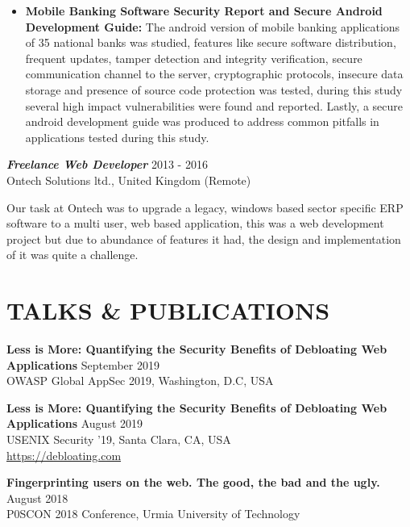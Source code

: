 \documentclass[margin, 10pt]{res} %
\begin{document}
\begin{resume}
\begin{itemize} \itemsep -2pt %
\item \textbf{Mobile Banking Software Security Report and Secure Android Development Guide:} The  android  version  of  mobile  banking  applications  of  35  national  banks  was studied,   features   like   secure   software   distribution,   frequent   updates,   tamper detection  and  integrity  verification,  secure  communication  channel  to  the  server, cryptographic  protocols,  insecure  data  storage  and  presence  of  source code protection  was tested,  during  this  study  several  high  impact  vulnerabilities  were  found  and reported.  Lastly,  a  secure  android  development  guide  was  produced  to  address common pitfalls in applications tested during this study.
\end{itemize}

{\sl \textbf{Freelance Web Developer}} \hfill 2013 - 2016\\
Ontech Solutions ltd., United Kingdom (Remote)


Our  task  at  Ontech  was  to  upgrade  a  legacy,  windows  based sector specific ERP software to a multi user, web based application, this was a web development  project  but  due  to  abundance  of     features  it  had,  the  design  and implementation of it was quite a challenge.




\section{TALKS \& PUBLICATIONS}

\textbf{Less is More: Quantifying the Security Benefits of Debloating Web Applications} \hfill September 2019\\
OWASP Global AppSec 2019, Washington, D.C, USA

\textbf{Less is More: Quantifying the Security Benefits of Debloating Web Applications} \hfill August 2019\\
USENIX Security '19, Santa Clara, CA, USA\\
\url{https://debloating.com}

\textbf{Fingerprinting users on the web. The good, the bad and the ugly.}
\hfill August 2018\\
P0SCON 2018 Conference, Urmia University of Technology


\end{resume}
\end{document}
